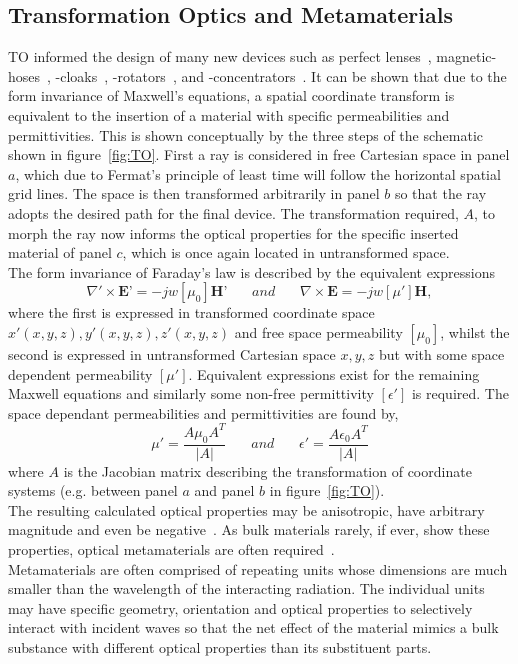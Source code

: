 \documentclass[11pt]{iopart}
\begin{document}
\subsection{Transformation Optics and Metamaterials}
TO informed the design of many new devices such as perfect
lenses~\cite{Pendry2000}, magnetic-hoses~\cite{Navau2014}, -cloaks~\cite{Sun2017},
-rotators~\cite{Sun2017}, and -concentrators~\cite{Navau2012}. It
can be shown that due to the form invariance of Maxwell's equations, a
spatial coordinate transform is equivalent to the insertion of a
material with specific permeabilities and permittivities. This is shown
conceptually by the three steps of the schematic shown in
figure~\ref{fig:TO}. First a ray is considered in free Cartesian space
in panel $a$, which due to Fermat's principle of least time will 
follow the horizontal spatial grid lines.  The space is then
transformed arbitrarily in panel $b$ so that the ray adopts the
desired path for the final device. The transformation required, $A$,
to morph the ray now informs the optical properties for the specific
inserted material of panel $c$, which is once again located in
untransformed space.\\ The form invariance of Faraday's law is
described by the equivalent expressions
\begin{equation}
  \label{ME1}
  \nabla'\times \textbf{E'} = -jw[\mu_0]\textbf{H'}
  ~~~~~~~~and~~~~~~~~
  \nabla\times \textbf{E} = -jw[\mu']\textbf{H},
\end{equation}
where the first is expressed in transformed coordinate space $x'(x, y,
z), y'(x, y, z), z'(x, y, z)$ and free space permeability $[\mu_0]$,
whilst the second is expressed in untransformed Cartesian space $x, y,
z$ but with some space dependent permeability $[\mu']$.  Equivalent
expressions exist for the remaining Maxwell equations and similarly
some non-free permittivity $[\epsilon']$ is required. The space
dependant permeabilities and permittivities are found by,
\begin{equation}
  \label{eqn:J}
  \mu'=\frac{A\mu_0 A^T}{|A|}
  ~~~~~~~~and~~~~~~~~
  \epsilon'=\frac{A\epsilon_0 A^T}{|A|}
\end{equation}
where $A$ is the Jacobian matrix describing the transformation of
coordinate systems (e.g. between panel $a$ and panel $b$ in
figure~\ref{fig:TO}). \\ The resulting calculated optical properties
may be anisotropic, have arbitrary magnitude and even be
negative~\cite{Pendry2000}. As bulk materials rarely, if ever, show these
properties, optical metamaterials are often
required~\cite{Smith2004}. \\ Metamaterials are often comprised of
repeating units whose dimensions are much smaller than the wavelength
of the interacting radiation. The individual units may
have specific geometry, orientation and optical properties to
selectively interact with incident waves so that the net effect of the
material mimics a bulk substance with different optical properties
than its substituent parts.\\
\end{document}

